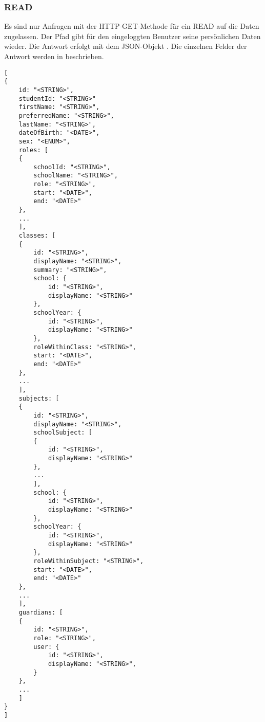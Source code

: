 \subsubsection{READ}
\label{sec:rest:api:user:read}
Es sind nur Anfragen mit der HTTP-GET-Methode für ein READ auf die Daten zugelassen.
Der Pfad gibt für den eingeloggten Benutzer seine persönlichen Daten wieder.
Die Antwort erfolgt mit dem JSON-Objekt . 
Die einzelnen Felder der Antwort werden in  beschrieben.

\begin{lstlisting}[caption={JSON-Antwort für einen GET-Aufruf des Pfads /api/users},label={lst:code:rest:api:user:read:ret},frame=tlrb]
[
{
	id: "<STRING>",
	studentId: "<STRING>"
 	firstName: "<STRING>",
 	preferredName: "<STRING>",
 	lastName: "<STRING>",
 	dateOfBirth: "<DATE>",
 	sex: "<ENUM>",
 	roles: [
 	{
 		schoolId: "<STRING>",
 		schoolName: "<STRING>",
 		role: "<STRING>",
 		start: "<DATE>",
 		end: "<DATE>"
 	},
 	...
 	],
 	classes: [
 	{
 		id: "<STRING>",
 		displayName: "<STRING>",
 		summary: "<STRING>",
 		school: {
 			id: "<STRING>",
 			displayName: "<STRING>"
 		},
 		schoolYear: {
 			id: "<STRING>",
 			displayName: "<STRING>"
 		},
 		roleWithinClass: "<STRING>",
 		start: "<DATE>",
 		end: "<DATE>"
 	},
 	...
	],
	subjects: [
	{
		id: "<STRING>",
		displayName: "<STRING>",
		schoolSubject: [
 		{
 			id: "<STRING>",
 			displayName: "<STRING>"
 		},
 		...
 		],
 		school: {
 			id: "<STRING>",
 			displayName: "<STRING>"
 		},
 		schoolYear: {
 			id: "<STRING>",
 			displayName: "<STRING>"
 		},
 		roleWithinSubject: "<STRING>",
 		start: "<DATE>",
 		end: "<DATE>" 		
	},
	...
	],
	guardians: [
	{
		id: "<STRING>",
		role: "<STRING>",
		user: {
			id: "<STRING>",
			displayName: "<STRING>",
		}
	},
	...
	]
}
]
\end{lstlisting}

